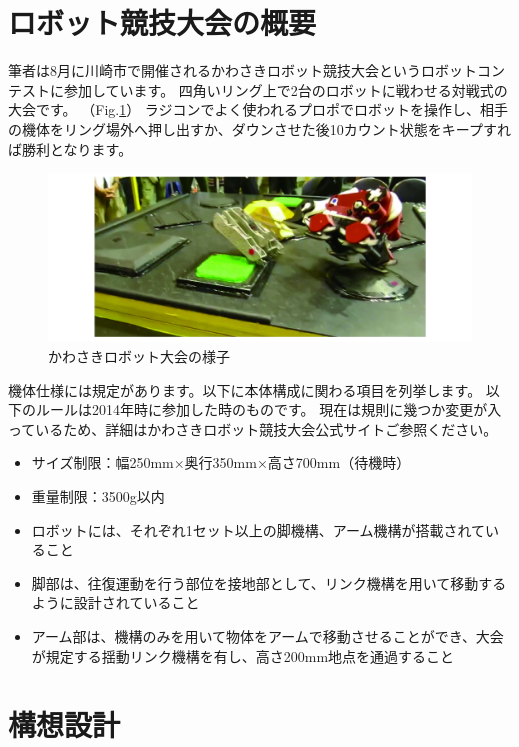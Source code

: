 \section{ロボット競技大会の概要}\label{ux30edux30dcux30c3ux30c8ux7af6ux6280ux5927ux4f1aux306eux6982ux8981}

筆者は8月に川崎市で開催されるかわさきロボット競技大会というロボットコンテストに参加しています。
四角いリング上で2台のロボットに戦わせる対戦式の大会です。
（Fig.\ref{fig34}）
ラジコンでよく使われるプロポでロボットを操作し、相手の機体をリング場外へ押し出すか、ダウンさせた後10カウント状態をキープすれば勝利となります。

\begin{figure}[htbp]
\centering
\includegraphics[width=380pt]{fig/fig34_cmyk.jpg}
\caption{かわさきロボット大会の様子}
\label{fig34}
\end{figure}

機体仕様には規定があります。以下に本体構成に関わる項目を列挙します。
以下のルールは2014年時に参加した時のものです。
現在は規則に幾つか変更が入っているため、詳細はかわさきロボット競技大会公式サイト\cite{kawasaki_public_HP}ご参照ください。

\begin{itemize}
\tightlist
\item
  サイズ制限：幅250mm×奥行350mm×高さ700mm（待機時）
\item
  重量制限：3500g以内
\item
  ロボットには、それぞれ1セット以上の脚機構、アーム機構が搭載されていること
\item
  脚部は、往復運動を行う部位を接地部として、リンク機構を用いて移動するように設計されていること
\item
  アーム部は、機構のみを用いて物体をアームで移動させることができ、大会が規定する揺動リンク機構を有し、高さ200mm地点を通過すること
\end{itemize}

\section{構想設計}\label{ux69cbux60f3ux8a2dux8a08}

